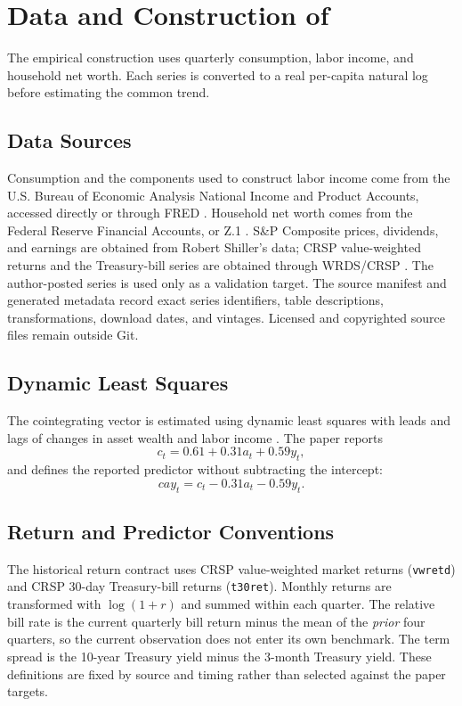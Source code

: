 \section{Data and Construction of \cay}

The empirical construction uses quarterly consumption, labor income, and
household net worth. Each series is converted to a real per-capita natural
log before estimating the common trend.

\subsection{Data Sources}

Consumption and the components used to construct labor income come from the
U.S. Bureau of Economic Analysis National Income and Product Accounts,
accessed directly or through FRED \citep{bea_nipa,fred}. Household net worth
comes from the Federal Reserve Financial Accounts, or Z.1
\citep{federal_reserve_z1}. S\&P Composite prices, dividends, and earnings are
obtained from Robert Shiller's data; CRSP value-weighted returns and the
Treasury-bill series are obtained through WRDS/CRSP
\citep{shiller_data,crsp_data}. The author-posted \cay{} series is used only as
a validation target.
The source manifest and generated metadata record exact series identifiers,
table descriptions, transformations, download dates, and vintages. Licensed
and copyrighted source files remain outside Git.

\subsection{Dynamic Least Squares}

The cointegrating vector is estimated using dynamic least squares with leads
and lags of changes in asset wealth and labor income \citep{stock_watson_1993}.
The paper reports
\[
c_t = 0.61 + 0.31a_t + 0.59y_t,
\]
and defines the reported predictor without subtracting the intercept:
\[
cay_t = c_t - 0.31a_t - 0.59y_t.
\]

\subsection{Return and Predictor Conventions}

The historical return contract uses CRSP value-weighted market returns
(\texttt{vwretd}) and CRSP 30-day Treasury-bill returns
(\texttt{t30ret}). Monthly returns are transformed with
$\log(1+r)$ and summed within each quarter. The relative bill rate is the
current quarterly bill return minus the mean of the \emph{prior} four
quarters, so the current observation does not enter its own benchmark. The
term spread is the 10-year Treasury yield minus the 3-month Treasury yield.
These definitions are fixed by source and timing rather than selected against
the paper targets.

